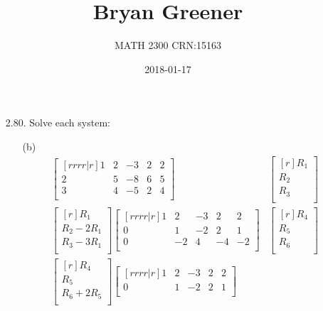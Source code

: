 \documentclass[12pt]{article}
\title{Bryan Greener}
\author{MATH 2300 CRN:15163}
\date{2018-01-17}
\begin{document}
\maketitle

\TabPositions{4cm}
\begin{enumerate}
\item[2.80.] Solve each system:\\
	\begin{enumerate}
	\item[(b)]
	\begin{align*}
	\begin{bmatrix}[rrrr|r]
	1 & 2 & -3 & 2 & 2\\
	2 & 5 & -8 & 6 & 5\\
	3 & 4 & -5 & 2 & 4\\
	\end{bmatrix}&
	\begin{bmatrix}[r]
	R_1\\ R_2\\ R_3\\
	\end{bmatrix}\\
	\begin{bmatrix}[r]
	R_1\\
	R_2 - 2R_1\\
	R_3-3R_1\\
	\end{bmatrix}
	\begin{bmatrix}[rrrr|r]
	1 & 2 & -3 & 2 & 2\\
	0 & 1 & -2 & 2 & 1\\
	0 & -2 & 4 & -4 & -2\\
	\end{bmatrix}&
	\begin{bmatrix}[r]
	R_{4}\\ R_{5}\\ R_{6}\\	
	\end{bmatrix}\\
	\begin{bmatrix}[r]
	R_4\\
	R_5\\
	R_6 + 2R_5\\
	\end{bmatrix}
	\begin{bmatrix}[rrrr|r]
	1 & 2 & -3 & 2 & 2\\
	0 & 1 & -2 & 2 & 1\\

\end{bmatrix}
\end{align*}
\end{enumerate}
\end{enumerate}
\end{document}
